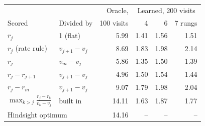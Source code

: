 \begin{tabular}{llrrrr}
\toprule
 & & Oracle, & \multicolumn{3}{c}{Learned, 200 visits} \\
Scored & Divided by & 100 visits & 4 & 6 & 7 rungs \\
\midrule
$r_j$ & 1 (flat) & 5.99 & 1.41 & 1.56 & 1.51 \\
$r_j$ (rate rule) & $v_{j+1}-v_j$ & 8.69 & 1.83 & 1.98 & 2.14 \\
$r_j$ & $v_m-v_j$ & 5.86 & 1.35 & 1.50 & 1.39 \\
$r_j-r_{j+1}$ & $v_{j+1}-v_j$ & 4.96 & 1.50 & 1.54 & 1.44 \\
$r_j-r_m$ & $v_{j+1}-v_j$ & 9.07 & 1.79 & 1.98 & 2.04 \\
$\max_{k>j}\frac{r_j-r_k}{v_k-v_j}$ & built in & 14.11 & 1.63 & 1.87 & 1.77 \\
\midrule
\multicolumn{2}{l}{Hindsight optimum} & 14.16 & -- & -- & -- \\
\bottomrule
\end{tabular}
